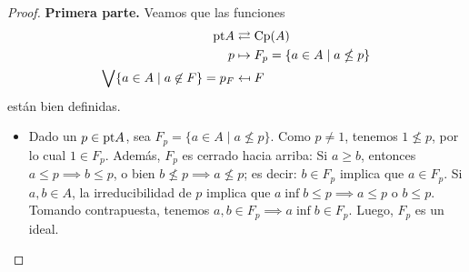 \begin{proof}
    \textbf{Primera parte.}
    Veamos que las funciones
    \begin{align*}
        \mathrm{pt} A &\rightleftarrows \mathrm{Cp}(A) \\
        p &\mapsto F_p = \{a\in A\mid a\nleq p\} \\
        \bigvee\{a\in A\mid a\not\in F\} = p_F &\mapsfrom F
    \end{align*}
    están bien definidas.
    \begin{itemize}
        \item
        Dado un $p\in\mathrm{pt} A$, sea $F_p=\{a\in A\mid a\nleq p\}$.
        Como $p\neq 1$, tenemos $1\nleq p$, por lo cual
        $1\in F_p$.
        Además, $F_p$ es cerrado hacia arriba:
        Si $a\geq b$, entonces $a\leq p\implies b\leq p$,
        o bien $b\nleq p\implies a\nleq p$;
        es decir: $b\in F_p$ implica que $a\in F_p$.
        Si $a,b\in A$, la irreducibilidad de $p$ implica que
        $a\inf b\leq p \implies a\leq p \text{ o } b\leq p$.
        Tomando contrapuesta, tenemos
        $a,b\in F_p \implies a\inf b\in F_p$.
        Luego, $F_p$ es un ideal.
        

\end{itemize}
\end{proof}
